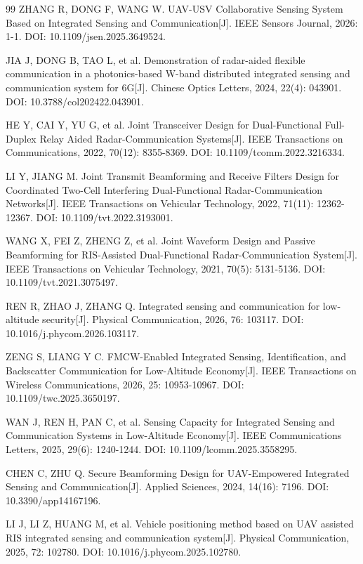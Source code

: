 \begin{thebibliography}{99}
 ZHANG R, DONG F, WANG W. UAV-USV Collaborative Sensing System Based on Integrated Sensing and Communication[J]. IEEE Sensors Journal, 2026: 1-1. DOI: 10.1109/jsen.2025.3649524.

 JIA J, DONG B, TAO L, et al. Demonstration of radar-aided flexible communication in a photonics-based W-band distributed integrated sensing and communication system for 6G[J]. Chinese Optics Letters, 2024, 22(4): 043901. DOI: 10.3788/col202422.043901.

 HE Y, CAI Y, YU G, et al. Joint Transceiver Design for Dual-Functional Full-Duplex Relay Aided Radar-Communication Systems[J]. IEEE Transactions on Communications, 2022, 70(12): 8355-8369. DOI: 10.1109/tcomm.2022.3216334.

 LI Y, JIANG M. Joint Transmit Beamforming and Receive Filters Design for Coordinated Two-Cell Interfering Dual-Functional Radar-Communication Networks[J]. IEEE Transactions on Vehicular Technology, 2022, 71(11): 12362-12367. DOI: 10.1109/tvt.2022.3193001.

 WANG X, FEI Z, ZHENG Z, et al. Joint Waveform Design and Passive Beamforming for RIS-Assisted Dual-Functional Radar-Communication System[J]. IEEE Transactions on Vehicular Technology, 2021, 70(5): 5131-5136. DOI: 10.1109/tvt.2021.3075497.

 REN R, ZHAO J, ZHANG Q. Integrated sensing and communication for low-altitude security[J]. Physical Communication, 2026, 76: 103117. DOI: 10.1016/j.phycom.2026.103117.

 ZENG S, LIANG Y C. FMCW-Enabled Integrated Sensing, Identification, and Backscatter Communication for Low-Altitude Economy[J]. IEEE Transactions on Wireless Communications, 2026, 25: 10953-10967. DOI: 10.1109/twc.2025.3650197.

 WAN J, REN H, PAN C, et al. Sensing Capacity for Integrated Sensing and Communication Systems in Low-Altitude Economy[J]. IEEE Communications Letters, 2025, 29(6): 1240-1244. DOI: 10.1109/lcomm.2025.3558295.

 CHEN C, ZHU Q. Secure Beamforming Design for UAV-Empowered Integrated Sensing and Communication[J]. Applied Sciences, 2024, 14(16): 7196. DOI: 10.3390/app14167196.

 LI J, LI Z, HUANG M, et al. Vehicle positioning method based on UAV assisted RIS integrated sensing and communication system[J]. Physical Communication, 2025, 72: 102780. DOI: 10.1016/j.phycom.2025.102780.


\end{thebibliography}
